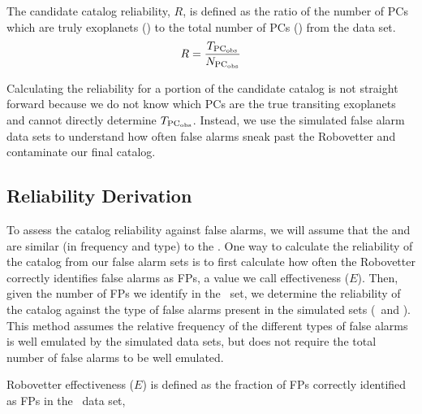 

The candidate catalog reliability, $R$, is defined as the ratio of the number of PCs which are truly exoplanets (\trueopspc) to the total number of PCs (\opspc) from the \opstce{} data set. 
\begin{equation}
\label{eq:rel}
R = \frac{T_{\rm PC_{\rm obs}}}{N_{\rm PC_{\rm obs}}}
\end{equation}

Calculating the reliability for a portion of the candidate catalog is not straight forward because we do not know which PCs are the true transiting exoplanets and cannot directly determine $T_{\rm PC_{\rm obs}}$. Instead, we use the simulated false alarm data sets to understand how often false alarms sneak past the Robovetter and contaminate our final catalog.


\subsection{Reliability Derivation}
\label{s:relcalc}
To assess the catalog reliability against false alarms, we will assume that the  and  are similar (in frequency and type) to the \opstces.  One way to calculate the reliability of the catalog from our false alarm sets is to first calculate how often the Robovetter correctly identifies false alarms as FPs, a value we call effectiveness ($E$).  Then, given the number of FPs we identify in the \opstce\ set, we determine the reliability of the catalog against the type of false alarms present in the simulated sets (\invtces\ and \scrtces). This method assumes the relative frequency of the different types of false alarms is well emulated by the simulated data sets, but does not require the total number of false alarms to be well emulated.


Robovetter effectiveness ($E$) is defined as the fraction of FPs correctly identified as FPs in the \opstce\ data set,

